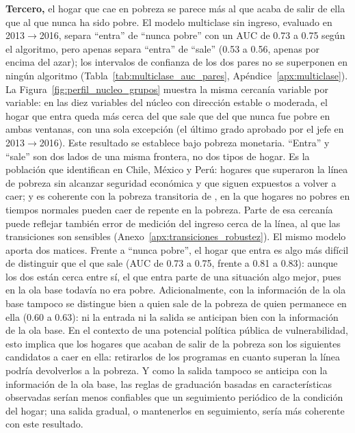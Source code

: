 \documentclass[12pt, letterpaper]{article}
\begin{document}
\textbf{Tercero,} el hogar que cae en pobreza se parece más al que acaba
de salir de ella que al que nunca ha sido pobre. El modelo multiclase sin
ingreso, evaluado en 2013$\to$2016, separa ``entra'' de ``nunca pobre''
con un AUC de 0.73 a 0.75 según el algoritmo, pero apenas separa
``entra'' de ``sale'' (0.53 a 0.56, apenas por encima del azar); los
intervalos de confianza de los dos pares no se superponen en ningún
algoritmo (Tabla~\ref{tab:multiclase_auc_pares},
Apéndice~\ref{apx:multiclase}). La Figura~\ref{fig:perfil_nucleo_grupos}
muestra la misma cercanía variable por variable: en las diez variables
del núcleo con dirección estable o moderada, el hogar que entra queda más
cerca del que sale que del que nunca fue pobre en ambas ventanas, con una
sola excepción (el último grado aprobado por el jefe en
2013$\to$2016). Este resultado se establece bajo pobreza monetaria.
``Entra'' y ``sale'' son dos lados de una misma frontera, no dos tipos de
hogar. Es la población que \textcite{lopezCalva2014} identifican en Chile,
México y Perú: hogares que superaron la línea de pobreza sin alcanzar
seguridad económica y que siguen expuestos a volver a caer; y es coherente
con la pobreza transitoria de \textcite{jalan2000}, en la que hogares no
pobres en tiempos normales pueden caer de repente en la pobreza. Parte de
esa cercanía puede reflejar también error de medición del ingreso cerca de
la línea, al que las transiciones son sensibles
(Anexo~\ref{apx:transiciones_robustez}). El mismo modelo aporta dos matices. 
Frente a ``nunca pobre'', el hogar que entra es algo más difícil de 
distinguir que el que sale (AUC de 0.73 a 0.75, frente a 0.81 a 0.83): 
aunque los dos están cerca entre sí, el que entra parte de una situación 
algo mejor, pues en la ola base todavía no era pobre. 
Adicionalmente, con la información de la ola base tampoco se distingue bien a
quien sale de la pobreza de quien permanece en ella (0.60 a 0.63): ni la
entrada ni la salida se anticipan bien con la información de la ola base. En el contexto de
una potencial política pública de vulnerabilidad, esto implica que los
hogares que acaban de salir de la pobreza son los siguientes candidatos a
caer en ella: retirarlos de los programas en cuanto superan la línea
podría devolverlos a la pobreza. Y como la salida tampoco se anticipa
con la información de la ola base, las reglas de graduación basadas en características
observadas serían menos confiables que un seguimiento periódico de la
condición del hogar; una salida gradual, o mantenerlos en seguimiento,
sería más coherente con este resultado.
\end{document}
